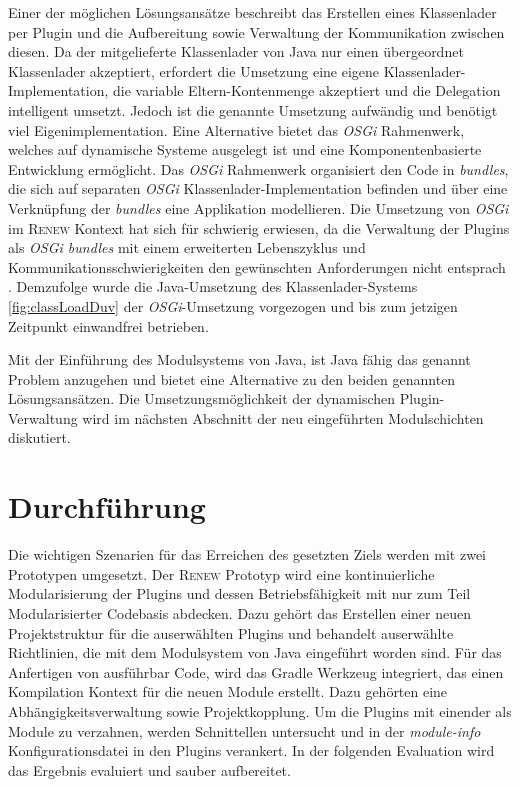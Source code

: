 		Einer der möglichen Lösungsansätze beschreibt das Erstellen eines Klassenlader per Plugin und die Aufbereitung sowie Verwaltung der Kommunikation zwischen diesen. Da der mitgelieferte Klassenlader von Java nur einen übergeordnet Klassenlader akzeptiert, erfordert die Umsetzung eine eigene Klassenlader-Implementation, die variable Eltern-Kontenmenge akzeptiert und die Delegation intelligent umsetzt. Jedoch ist die genannte Umsetzung aufwändig und benötigt viel Eigenimplementation. \newline
		Eine Alternative bietet das \textit{OSGi} Rahmenwerk, welches auf dynamische Systeme ausgelegt ist und eine Komponentenbasierte Entwicklung ermöglicht. Das \textit{OSGi} Rahmenwerk organisiert den Code in \textit{bundles}, die sich auf separaten \textit{OSGi} Klassenlader-Implementation befinden und über eine Verknüpfung der \textit{bundles} eine Applikation modellieren. \newline
		Die Umsetzung von \textit{OSGi} im \textsc{Renew} Kontext hat sich für schwierig erwiesen, da die Verwaltung der Plugins als \textit{OSGi bundles} mit einem erweiterten Lebenszyklus und Kommunikationsschwierigkeiten den gewünschten Anforderungen nicht entsprach \cite{Duvigneau09}. Demzufolge wurde die Java-Umsetzung des Klassenlader-Systems \ref{fig:classLoadDuv} der \textit{OSGi}-Umsetzung vorgezogen und bis zum jetzigen Zeitpunkt einwandfrei betrieben. \bigbreak

		Mit der Einführung des Modulsystems von Java, ist Java fähig das genannt Problem anzugehen und bietet eine Alternative zu den beiden genannten Lösungsansätzen. Die Umsetzungsmöglichkeit der dynamischen Plugin-Verwaltung wird im nächsten Abschnitt der neu eingeführten Modulschichten diskutiert. 


\section{Durchführung} \label{sec:durchführung}
	Die wichtigen Szenarien für das Erreichen des gesetzten Ziels werden mit zwei Prototypen umgesetzt. Der \textsc{Renew} Prototyp wird eine kontinuierliche  Modularisierung der Plugins und dessen Betriebsfähigkeit mit nur zum Teil Modularisierter Codebasis abdecken. Dazu gehört das Erstellen einer neuen Projektstruktur für die auserwählten Plugins und behandelt auserwählte Richtlinien, die mit dem Modulsystem von Java eingeführt worden sind. Für das Anfertigen von ausführbar Code, wird das Gradle Werkzeug integriert, das einen Kompilation Kontext für die neuen Module erstellt. Dazu gehörten eine Abhängigkeitsverwaltung sowie Projektkopplung. Um die Plugins mit einender als Module zu verzahnen, werden Schnittellen untersucht und in der \textit{module-info} Konfigurationsdatei in den Plugins verankert. In der folgenden Evaluation wird das Ergebnis evaluiert und sauber aufbereitet.\bigbreak 

